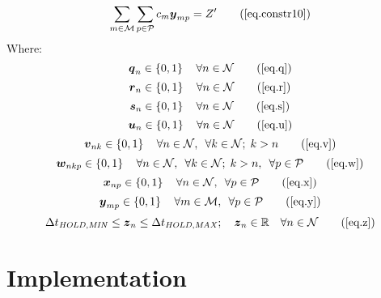\begin{equation}
    \sum_{m \in \mathcal{M}} \sum_{p \in \mathcal{P}} c_m 
    \boldsymbol{y}_{mp} = Z^{\prime}
    \tag{\ref{eq.constr10}}
\end{equation}
Where:
\begin{equation}
    \boldsymbol{q}_{n} \in \left\{0, 1\right\} \quad \forall n \in \mathcal{N}
    \tag{\ref{eq.q}}
\end{equation}
\begin{equation}
    \boldsymbol{r}_{n} \in \left\{ 0, 1 \right\} \quad \forall n \in
    \mathcal{N}
    \tag{\ref{eq.r}}
\end{equation}
\begin{equation}
    \boldsymbol{s}_{n} \in \left\{ 0, 1 \right\} \quad \forall n \in
    \mathcal{N}
    \tag{\ref{eq.s}}
\end{equation} 
\begin{equation}
    \boldsymbol{u}_{n} \in \left\{ 0, 1 \right\} \quad \forall n \in
    \mathcal{N}
    \tag{\ref{eq.u}}
\end{equation}
\begin{equation}
    \boldsymbol{v}_{nk} \in \left\{ 0, 1 \right\} \quad \forall n \in
    \mathcal{N}, \enspace \forall k \in \mathcal{N}; \; k > n
    \tag{\ref{eq.v}}
\end{equation}
\begin{equation}
    \boldsymbol{w}_{nkp} \in \left\{ 0, 1 \right\} \quad \forall n \in 
    \mathcal{N}, \enspace \forall k \in \mathcal{N}; \; k > n, \enspace \forall
    p \in \mathcal{P}
    \tag{\ref{eq.w}}
\end{equation}
\begin{equation}
    \boldsymbol{x}_{np} \in \left\{ 0, 1 \right\} \quad \forall n \in
    \mathcal{N}, \enspace \forall p \in \mathcal{P}
    \tag{\ref{eq.x}}
\end{equation}
\begin{equation}
    \boldsymbol{y}_{mp} \in \left\{ 0, 1 \right\} \quad \forall m \in
    \mathcal{M}, \enspace \forall p \in \mathcal{P}
    \tag{\ref{eq.y}}
\end{equation}
\begin{equation}
    \Delta t_{\mathit{HOLD,MIN}} \le \boldsymbol{z}_{n} \le 
    \Delta t_{\mathit{HOLD,MAX}}; \quad
    \boldsymbol{z}_{n} \in \mathbb{R} \quad \forall n \in \mathcal{N}
    \tag{\ref{eq.z}}
\end{equation}

\section{Implementation}\label{S.implementation}

